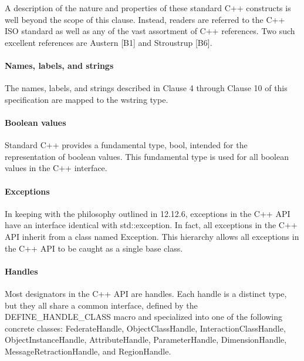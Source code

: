 \clearpage

\begin{compactstdpage}
    A description of the nature and properties of these standard C++ constructs is well beyond the scope of this clause. Instead, readers are referred to the C++ ISO standard as well as any of the vast assortment of C++ references. Two such excellent references are Austern [B1] and Stroustrup [B6].

    \paragraph{Names, labels, and strings}

    The names, labels, and strings described in Clause 4 through Clause 10 of this specification are mapped to the wstring type.

    \paragraph{Boolean values}

    Standard C++ provides a fundamental type, bool, intended for the representation of boolean values. This fundamental type is used for all boolean values in the C++ interface.

    \paragraph{Exceptions}

    In keeping with the philosophy outlined in 12.12.6, exceptions in the C++ API have an interface identical with std::exception. In fact, all exceptions in the C++ API inherit from a class named Exception. This hierarchy allows all exceptions in the C++ API to be caught as a single base class.

    \paragraph{Handles}

    Most designators in the C++ API are handles. Each handle is a distinct type, but they all share a common interface, defined by the DEFINE\_HANDLE\_CLASS macro and specialized into one of the following concrete classes: FederateHandle, ObjectClassHandle, InteractionClassHandle, ObjectInstanceHandle, AttributeHandle, ParameterHandle, DimensionHandle, MessageRetractionHandle, and RegionHandle.


\end{compactstdpage}
